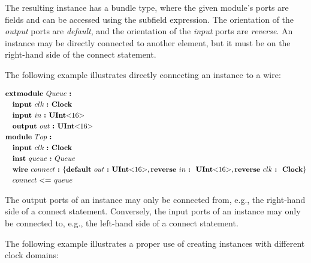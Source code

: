 \documentclass[12pt]{article}
\begin{document}
The resulting instance has a bundle type, where the given module's ports are fields and can be accessed using the subfield expression.
The orientation of the {\em output} ports are {\em default}, and the orientation of the {\em input} ports are {\em reverse}.
An instance may be directly connected to another element, but it must be on the right-hand side of the connect statement.

The following example illustrates directly connecting an instance to a wire:

{ \fontsize{11pt}{1.15em}\selectfont
\[
\begin{aligned}
&\kw{extmodule} Queue \ \kws{:} \\
&\quad \kw{input} clk  \ \kw{:} \kws{Clock} \\
&\quad \kw{input} in   \ \kw{:} \kws{UInt$<$}16\kws{$>$} \\
&\quad \kw{output} out \ \kw{:} \kws{UInt$<$}16\kws{$>$} \\
&\kw{module} Top \ \kws{:} \\
&\quad \kw{input} clk  \ \kw{:} \kws{Clock} \\
&\quad \kw{inst} queue \ \kw{:} Queue \\
&\quad \kw{wire} connect \ \kw{:} \bundleT{\kw{default} out \ \kw{:} \kws{UInt$<$}16\kws{$>$},\kw{reverse} in \ \kw{:} \ \kws{UInt$<$}16\kws{$>$},\kw{reverse} clk \ \kw{:} \ \kws{Clock}} \\
&\quad connect \ \kw{$<$=} queue \\
\end{aligned}
\]
}

The output ports of an instance may only be connected from, e.g., the right-hand side of a connect statement.
Conversely, the input ports of an instance may only be connected to, e.g., the left-hand side of a connect statement.

The following example illustrates a proper use of creating instances with different clock domains:
\end{document}
